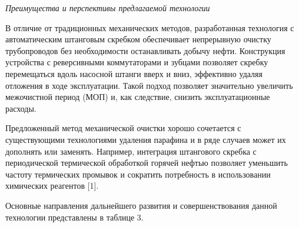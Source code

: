 \begin{multicols}{2}
\emph{Преимущества и перспективы предлагаемой технологии}

В отличие от традиционных механических методов, разработанная технология
с автоматическим штанговым скребком обеспечивает непрерывную очистку
трубопроводов без необходимости останавливать добычу нефти. Конструкция
устройства с реверсивными коммутаторами и зубцами позволяет скребку
перемещаться вдоль насосной штанги вверх и вниз, эффективно удаляя
отложения в ходе эксплуатации. Такой подход позволяет значительно
увеличить межочистной период (МОП) и, как следствие, снизить
эксплуатационные расходы.

Предложенный метод механической очистки хорошо сочетается с
существующими технологиями удаления парафина и в ряде случаев может их
дополнять или заменять. Например, интеграция штангового скребка с
периодической термической обработкой горячей нефтью позволяет уменьшить
частоту термических промывок и сократить потребность в использовании
химических реагентов {[}1{]}.

Основные направления дальнейшего развития и совершенствования данной
технологии представлены в таблице 3.
\end{multicols}

